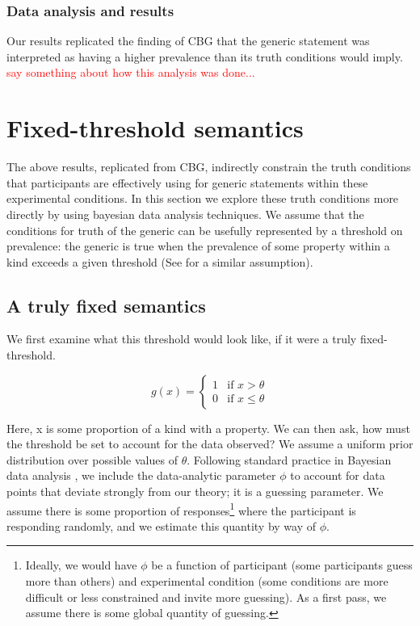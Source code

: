 \documentclass[10pt,letterpaper]{article}
\newcommand{\red}[1]{\textcolor{Red}{#1}}
\begin{document}
\subsubsection{Data analysis and results}

%

Our results replicated the finding of CBG that the generic statement was interpreted as having a higher prevalence than its truth conditions would imply. 
\red{say something about how this analysis was done...}

\section{Fixed-threshold semantics}
The above results, replicated from CBG, indirectly constrain the truth conditions that participants are effectively using for generic statements within these experimental conditions. In this section we explore these truth conditions more directly by using bayesian data analysis techniques.
We assume that the conditions for truth of the generic can be usefully represented by a threshold on prevalence: the generic is true when the prevalence of some property within a kind exceeds a given threshold (See \cite{cohen} for a similar assumption).


\subsection{A truly fixed semantics}
We first examine what this threshold would look like, if it were a truly fixed-threshold. 


\[
 g(x) =
  \begin{cases}
   1 & \text{if } x > \theta \\
   0       & \text{if } x \leq \theta
  \end{cases}
\]

Here, x is some proportion of a kind with a property. We can then ask, how must the threshold be set to account for the data observed? We assume a uniform prior distribution over possible values of $\theta$. Following standard practice in Bayesian data analysis \cite{LW2014}, we include the data-analytic parameter $\phi$ to account for data points that deviate strongly from our theory; it is a guessing parameter. We assume there is some proportion of responses\footnote{Ideally, we would have $\phi$ be a function of participant (some participants guess more than others) and experimental condition (some conditions are more difficult or less constrained and invite more guessing). As a first pass, we assume there is some global quantity of guessing.} where the participant is responding randomly, and we estimate this quantity by way of $\phi$.
\end{document}
